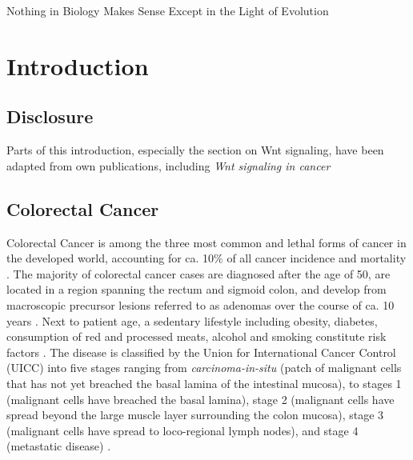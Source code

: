 \begin{savequote}[75mm]
Nothing in Biology Makes Sense Except in the Light of Evolution
\end{savequote}

\chapter{Introduction}
\label{introduction}
\begin{flushleft}
\setlength{\parindent}{7ex}
\section{Disclosure}
Parts of this introduction, especially the section on Wnt signaling, have been adapted from own publications, including \textit{Wnt signaling in cancer} \cite{Zhan2017}

\section{Colorectal Cancer}
Colorectal Cancer is among the three most common and lethal forms of cancer in the developed world, accounting for ca. 10\% of all cancer incidence and mortality \cite{sungGlobalCancerStatistics2021}. The majority of colorectal cancer cases are diagnosed after the age of 50, are located in a region spanning the rectum and sigmoid colon, and develop from macroscopic precursor lesions referred to as adenomas over the course of ca. 10 years \cite{Cho1992}. Next to patient age, a sedentary lifestyle including obesity, diabetes, consumption of red and processed meats, alcohol and smoking constitute risk factors \cite{sungGlobalCancerStatistics2021}. The disease is classified by the Union for International Cancer Control (UICC) into five stages ranging from \textit{carcinoma-in-situ} (patch of malignant cells that has not yet breached the basal lamina of the intestinal mucosa), to stages 1 (malignant cells have breached the basal lamina), stage 2 (malignant cells have spread beyond the large muscle layer surrounding the colon mucosa), stage 3 (malignant cells have spread to loco-regional lymph nodes), and stage 4 (metastatic disease) \cite{ColorectalCancerStages2012}.
\par


\end{flushleft}
